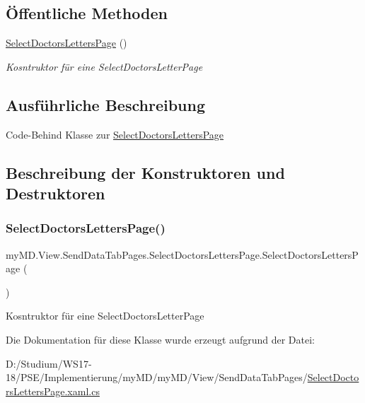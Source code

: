 \subsection*{Öffentliche Methoden}
\begin{DoxyCompactItemize}
\item 
\mbox{\hyperlink{classmy_m_d_1_1_view_1_1_send_data_tab_pages_1_1_select_doctors_letters_page_a8ae482a882150437ce322f4796d6c98e}{Select\+Doctors\+Letters\+Page}} ()
\begin{DoxyCompactList}\small\item\em Kosntruktor für eine Select\+Doctors\+Letter\+Page \end{DoxyCompactList}\end{DoxyCompactItemize}


\subsection{Ausführliche Beschreibung}
Code-\/\+Behind Klasse zur \mbox{\hyperlink{classmy_m_d_1_1_view_1_1_send_data_tab_pages_1_1_select_doctors_letters_page}{Select\+Doctors\+Letters\+Page}} 



\subsection{Beschreibung der Konstruktoren und Destruktoren}
\mbox{\label{classmy_m_d_1_1_view_1_1_send_data_tab_pages_1_1_select_doctors_letters_page_a8ae482a882150437ce322f4796d6c98e}} 
\subsubsection{\texorpdfstring{Select\+Doctors\+Letters\+Page()}{SelectDoctorsLettersPage()}}
{\footnotesize\ttfamily my\+M\+D.\+View.\+Send\+Data\+Tab\+Pages.\+Select\+Doctors\+Letters\+Page.\+Select\+Doctors\+Letters\+Page (\begin{DoxyParamCaption}{ }\end{DoxyParamCaption})}



Kosntruktor für eine Select\+Doctors\+Letter\+Page 



Die Dokumentation für diese Klasse wurde erzeugt aufgrund der Datei\+:\begin{DoxyCompactItemize}
\item 
D\+:/\+Studium/\+W\+S17-\/18/\+P\+S\+E/\+Implementierung/my\+M\+D/my\+M\+D/\+View/\+Send\+Data\+Tab\+Pages/\mbox{\hyperlink{_select_doctors_letters_page_8xaml_8cs}{Select\+Doctors\+Letters\+Page.\+xaml.\+cs}}\end{DoxyCompactItemize}
